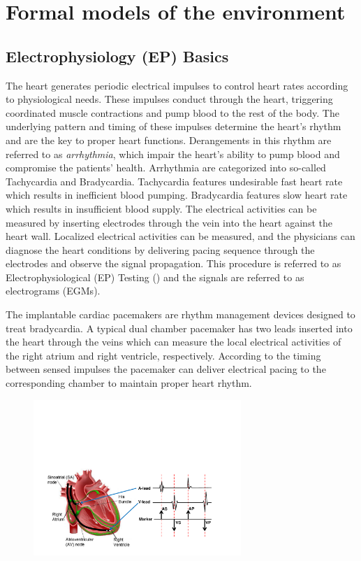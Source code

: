 \section{Formal models of the environment}
\label{formalModelsofEnv}


\subsection{Electrophysiology (EP) Basics}
The heart generates periodic electrical impulses to control heart rates according to physiological needs. These impulses conduct through the heart, triggering coordinated muscle contractions and pump blood to the rest of the body. The underlying pattern and timing of these impulses determine the heart's rhythm and are the key to proper heart functions. Derangements in this rhythm are referred to as \emph{arrhythmia}, which impair the heart's ability to pump blood and compromise the patients' health. Arrhythmia are categorized into so-called \textsf{Tachycardia} and \textsf{Bradycardia}. Tachycardia features undesirable fast heart rate which results in inefficient blood pumping. Bradycardia features slow heart rate which results in insufficient blood supply. The electrical activities can be measured by inserting electrodes through the vein into the heart against the heart wall. Localized electrical activities can be measured, and the physicians can diagnose the heart conditions by delivering pacing sequence through the electrodes and observe the signal propagation. This procedure is referred to as Electrophysiological (EP) Testing  (\cite{josephson}) and the signals are referred to as electrograms (EGMs).

The implantable cardiac pacemakers are rhythm management devices designed to treat bradycardia. A typical dual chamber pacemaker has two leads inserted into the heart through the veins which can measure the local electrical activities of the right atrium and right ventricle, respectively. According to the timing between sensed impulses the pacemaker can deliver electrical pacing to the corresponding chamber to maintain proper heart rhythm.
\begin{figure}[!t]
	\centering
	\includegraphics[width=0.7\textwidth]{figs/egm.pdf}
	
	\caption{\small }
	\label{fig:probes}
\end{figure} 


